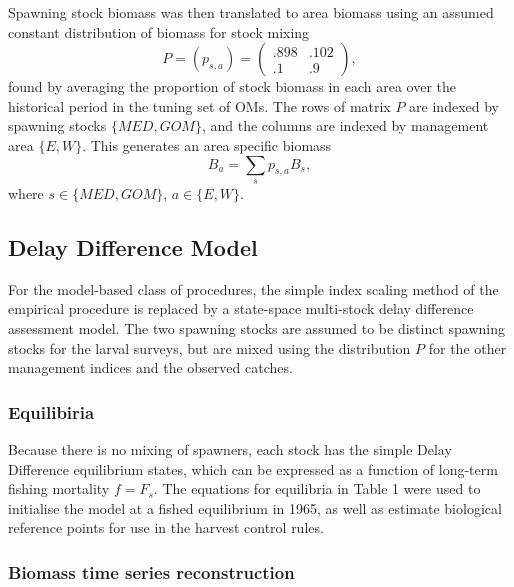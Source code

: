 \documentclass[]{article}
\begin{document}
Spawning stock biomass was then translated to area biomass using an
assumed constant distribution of biomass for stock mixing
\begin{equation}
P = (p_{s,a}) =  \left( \begin{array}{cc}
                .898 & .102 \\
                .1 & .9
            \end{array}
    \right),                    
\end{equation}
found by averaging the proportion of stock biomass in each area
over the historical period in the tuning set of OMs. The rows
of matrix \(P\) are indexed by spawning stocks \(\{MED, GOM\}\), and the
columns are indexed by management area \(\{ E, W\}\). This generates
an area specific biomass
\begin{equation}
B_a = \sum_{s} p_{s,a} B_s,
\end{equation}
where \(s \in \{MED, GOM\}\), \(a \in \{E, W\}\).

\hypertarget{delay-difference-model}{%
\subsection{Delay Difference Model}\label{delay-difference-model}}

For the model-based class of procedures, the simple index scaling
method of the empirical procedure is replaced by a state-space
multi-stock delay difference assessment model. The two spawning
stocks are assumed to be distinct spawning stocks for the larval
surveys, but are mixed using the distribution \(P\) for
the other management indices and the observed catches.

\hypertarget{equilibiria}{%
\subsubsection{Equilibiria}\label{equilibiria}}

Because there is no mixing of spawners, each stock has the simple Delay
Difference equilibrium states, which can be expressed as a function
of long-term fishing mortality \(f = F_s\). The equations for equilibria
in Table 1 were used to initialise the model at a fished equilibrium
in 1965, as well as estimate biological reference points for use in
the harvest control rules.

\hypertarget{biomass-time-series-reconstruction}{%
\subsubsection{Biomass time series reconstruction}\label{biomass-time-series-reconstruction}}
\end{document}
